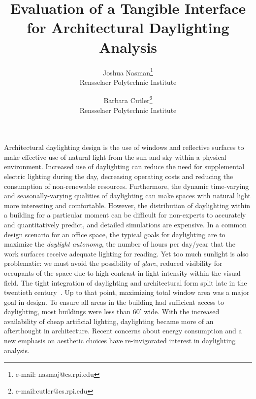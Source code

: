 \documentclass[review]{vgtc}                 %
\title{Evaluation of a Tangible Interface for Architectural Daylighting Analysis}
\author{Joshua Nasman\thanks{e-mail: nasmaj@cs.rpi.edu}\\ %
        \scriptsize Rensselaer Polytechnic Institute %
\and Barbara Cutler\thanks{e-mail:cutler@cs.rpi.edu}\\ %
     \scriptsize Rensselaer Polytechnic Institute }%
\begin{document}




\maketitle


Architectural daylighting design is the use of windows and reflective
surfaces to make effective use of natural light from the sun and sky
within a physical environment.  Increased use of daylighting can
reduce the need for supplemental electric lighting during the day,
decreasing operating costs and reducing the consumption of
non-renewable resources.  Furthermore, the dynamic time-varying and
seasonally-varying qualities of daylighting can make spaces with
natural light more interesting and comfortable.  However, the
distribution of daylighting within a building for a particular moment
can be difficult for non-experts to accurately and quantitatively
predict, and detailed simulations are expensive.  In a common design
scenario for an office space, the typical goals for daylighting are to
maximize the {\em daylight autonomy}, the number of hours per day/year
that the work surfaces receive adequate lighting for reading.  Yet too
much sunlight is also problematic: we must avoid the possibility of
{\em glare}, reduced visibility for occupants of the space due to high
contrast in light intensity within the visual field.
%
The tight integration of daylighting and architectural form split late
in the twentieth century~\cite{lechner2001heating}.  Up to that point,
maximizing total window area was a major goal in design.  To ensure
all areas in the building had sufficient access to daylighting, most
buildings were less than 60' wide.  With the increased availability of
cheap artificial lighting, daylighting became more of an afterthought
in architecture.  Recent concerns about energy consumption and a new
emphasis on aesthetic choices have re-invigorated interest in
daylighting analysis.

\end{document}
